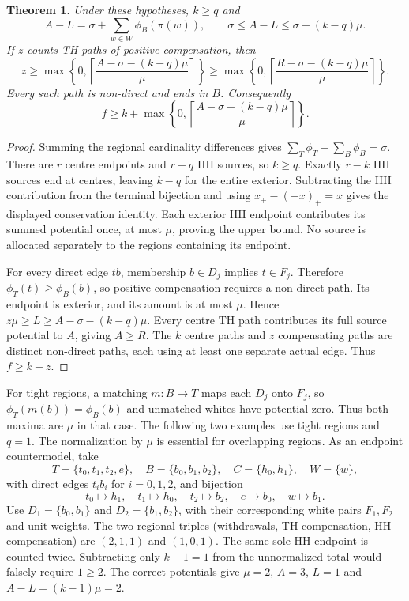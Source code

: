 \documentclass[11pt]{article}
\newtheorem{theorem}{Theorem}
\begin{document}
\begin{theorem}\label{thm:hallmulti}
Under these hypotheses, $k\ge q$ and
\[
 A-L=\sigma+\sum_{w\in W}\phi_B(\pi(w)),\qquad
 \sigma\le A-L\le\sigma+(k-q)\mu.
\]
If $z$ counts TH paths of positive compensation, then
\[
 z\ge\max\left\{0,\left\lceil\frac{A-\sigma-(k-q)\mu}{\mu}\right\rceil\right\}
 \ge\max\left\{0,\left\lceil\frac{R-\sigma-(k-q)\mu}{\mu}\right\rceil\right\}.
\]
Every such path is non-direct and ends in $B$. Consequently
\[
 f\ge k+\max\left\{0,\left\lceil\frac{A-\sigma-(k-q)\mu}{\mu}\right\rceil\right\}.
\]
\end{theorem}
\begin{proof}
Summing the regional cardinality differences gives
$\sum_T\phi_T-\sum_B\phi_B=\sigma$.
There are $r$ centre endpoints and $r-q$ HH sources, so $k\ge q$.
Exactly $r-k$ HH sources end at centres, leaving $k-q$ for the entire
exterior. Subtracting the HH contribution from the terminal bijection
and using $x_+-(-x)_+=x$ gives the displayed conservation identity.
Each exterior HH endpoint contributes its summed potential once, at
most $\mu$, proving the upper bound. No source is allocated separately
to the regions containing its endpoint.

For every direct edge $tb$, membership $b\in D_j$ implies $t\in F_j$.
Therefore $\phi_T(t)\ge\phi_B(b)$, so positive compensation requires
a non-direct path. Its endpoint is exterior, and its amount is at most
$\mu$. Hence $z\mu\ge L\ge A-\sigma-(k-q)\mu$. Every centre TH path
contributes its full source potential to $A$, giving $A\ge R$. The $k$
centre paths and $z$ compensating paths are distinct non-direct paths,
each using at least one separate actual edge. Thus $f\ge k+z$.
\end{proof}

For tight regions, a matching $m:B\to T$ maps each $D_j$ onto $F_j$,
so $\phi_T(m(b))=\phi_B(b)$ and unmatched whites have potential zero.
Thus both maxima are $\mu$ in that case. The following two examples use
tight regions and $q=1$.
The normalization by $\mu$ is essential for overlapping regions. As an
endpoint countermodel, take
\[
 T=\{t_0,t_1,t_2,e\},\quad B=\{b_0,b_1,b_2\},\quad
 C=\{h_0,h_1\},\quad W=\{w\},
\]
with direct edges $t_ib_i$ for $i=0,1,2$, and bijection
\[
 t_0\mapsto h_1,\quad t_1\mapsto h_0,\quad t_2\mapsto b_2,
 \quad e\mapsto b_0,\quad w\mapsto b_1.
\]
Use $D_1=\{b_0,b_1\}$ and $D_2=\{b_1,b_2\}$, with their corresponding
white pairs $F_1,F_2$ and unit weights. The two regional triples
(withdrawals, TH compensation, HH compensation) are $(2,1,1)$ and
$(1,0,1)$. The same sole HH endpoint is counted twice. Subtracting
only $k-1=1$ from the unnormalized total would falsely require $1\ge2$.
The correct potentials give $\mu=2$, $A=3$, $L=1$ and
$A-L=(k-1)\mu=2$.
\end{document}
